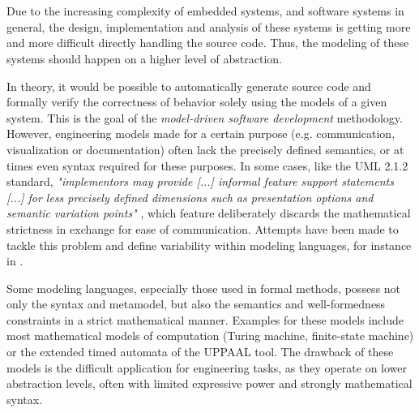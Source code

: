 \chapter{\bevezetes} \label{chapter_intro}

Due to the increasing complexity of embedded systems, and software systems in general, the design, implementation and analysis of these systems is getting more and more difficult directly handling the source code. Thus, the modeling of these systems should happen on a higher level of abstraction. 

In theory, it would be possible to automatically generate source code and formally verify the correctness of behavior solely using the models of a given system. This is the goal of the \textit{model-driven software development} methodology. However, engineering models made for a certain purpose (e.g. communication, visualization or documentation) often lack the precisely defined semantics, or at times even syntax required for these purposes. In some cases, like the UML 2.1.2 standard, \textit{"implementors may provide [...] informal feature support statements [...] for less precisely defined dimensions such as presentation options and semantic variation points"} \cite{UMLStandard212}, which feature deliberately discards the mathematical strictness in exchange for ease of communication. Attempts have been made to tackle this problem and define variability within modeling languages, for instance in \cite{VariabilityInModelingLanguages}.

Some modeling languages, especially those used in formal methods, possess not only the syntax and metamodel, but also the semantics and well-formedness constraints in a strict mathematical manner. Examples for these models include most mathematical models of computation (Turing machine, finite-state machine) or the extended timed automata of the UPPAAL tool. The drawback of these models is the difficult application for engineering tasks, as they operate on lower abstraction levels, often with limited expressive power and strongly mathematical syntax.


